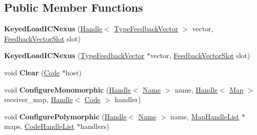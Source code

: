 \subsection*{Public Member Functions}
\begin{DoxyCompactItemize}
\item 
{\bfseries Keyed\+Load\+I\+C\+Nexus} (\hyperlink{classv8_1_1internal_1_1_handle}{Handle}$<$ \hyperlink{classv8_1_1internal_1_1_type_feedback_vector}{Type\+Feedback\+Vector} $>$ vector, \hyperlink{classv8_1_1internal_1_1_feedback_vector_slot}{Feedback\+Vector\+Slot} slot)\hypertarget{classv8_1_1internal_1_1_keyed_load_i_c_nexus_ad29ef8b76d9cecc662acb0983137fb25}{}\label{classv8_1_1internal_1_1_keyed_load_i_c_nexus_ad29ef8b76d9cecc662acb0983137fb25}

\item 
{\bfseries Keyed\+Load\+I\+C\+Nexus} (\hyperlink{classv8_1_1internal_1_1_type_feedback_vector}{Type\+Feedback\+Vector} $\ast$vector, \hyperlink{classv8_1_1internal_1_1_feedback_vector_slot}{Feedback\+Vector\+Slot} slot)\hypertarget{classv8_1_1internal_1_1_keyed_load_i_c_nexus_a75e9130cbefa0a8e369e522f5d7b1b20}{}\label{classv8_1_1internal_1_1_keyed_load_i_c_nexus_a75e9130cbefa0a8e369e522f5d7b1b20}

\item 
void {\bfseries Clear} (\hyperlink{classv8_1_1internal_1_1_code}{Code} $\ast$host)\hypertarget{classv8_1_1internal_1_1_keyed_load_i_c_nexus_a80eefde375c27a7ee08fc50e824b2771}{}\label{classv8_1_1internal_1_1_keyed_load_i_c_nexus_a80eefde375c27a7ee08fc50e824b2771}

\item 
void {\bfseries Configure\+Monomorphic} (\hyperlink{classv8_1_1internal_1_1_handle}{Handle}$<$ \hyperlink{classv8_1_1internal_1_1_name}{Name} $>$ name, \hyperlink{classv8_1_1internal_1_1_handle}{Handle}$<$ \hyperlink{classv8_1_1internal_1_1_map}{Map} $>$ receiver\+\_\+map, \hyperlink{classv8_1_1internal_1_1_handle}{Handle}$<$ \hyperlink{classv8_1_1internal_1_1_code}{Code} $>$ handler)\hypertarget{classv8_1_1internal_1_1_keyed_load_i_c_nexus_a9ded8f68d054976679622c0349254685}{}\label{classv8_1_1internal_1_1_keyed_load_i_c_nexus_a9ded8f68d054976679622c0349254685}

\item 
void {\bfseries Configure\+Polymorphic} (\hyperlink{classv8_1_1internal_1_1_handle}{Handle}$<$ \hyperlink{classv8_1_1internal_1_1_name}{Name} $>$ name, \hyperlink{classv8_1_1internal_1_1_list}{Map\+Handle\+List} $\ast$maps, \hyperlink{classv8_1_1internal_1_1_list}{Code\+Handle\+List} $\ast$handlers)\hypertarget{classv8_1_1internal_1_1_keyed_load_i_c_nexus_ad5902fb5df50c757c27b51880c1ebc43}{}\label{classv8_1_1internal_1_1_keyed_load_i_c_nexus_ad5902fb5df50c757c27b51880c1ebc43}


\end{DoxyCompactItemize}
